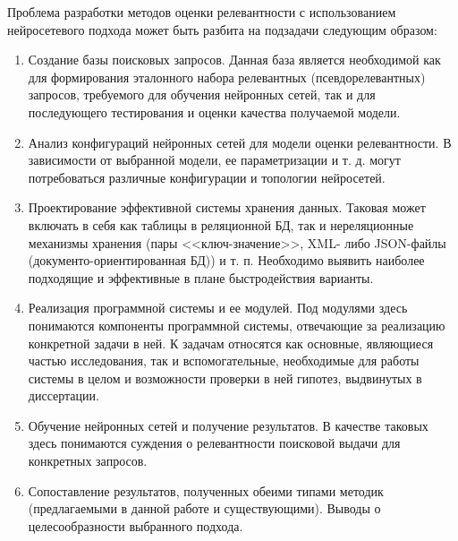 Проблема разработки методов оценки релевантности с использованием нейросетевого подхода может быть
разбита на подзадачи следующим образом:
\begin{enumerate}[1)]
    \item Создание базы поисковых запросов. Данная база является необходимой как для формирования эталонного
    набора релевантных (псевдорелевантных) запросов, требуемого для обучения нейронных сетей, так и для последующего
    тестирования и оценки качества получаемой модели.
    \item Анализ конфигураций нейронных сетей для модели оценки релевантности. В зависимости от выбранной модели,
    ее параметризации и т. д. могут потребоваться различные конфигурации и топологии нейросетей. 
    \item Проектирование эффективной системы хранения данных. Таковая может включать в себя как таблицы в реляционной
    БД, так и нереляционные механизмы хранения (пары <<ключ-значение>>, XML- либо JSON-файлы (документо-ориентированная БД))
    и т. п. Необходимо выявить наиболее подходящие и эффективные в плане быстродействия варианты.
    \item Реализация программной системы и ее модулей. Под модулями здесь понимаются компоненты программной системы,
    отвечающие за реализацию конкретной задачи в ней. К задачам относятся как основные, являющиеся частью исследования,
    так и вспомогательные, необходимые для работы системы в целом и возможности проверки в ней гипотез, выдвинутых в диссертации.
    \item Обучение нейронных сетей и получение результатов. В качестве таковых здесь понимаются суждения о релевантности
    поисковой выдачи для конкретных запросов.
    \item Сопоставление результатов, полученных обеими типами методик (предлагаемыми в данной работе и существующими). 
    Выводы о целесообразности выбранного подхода.
\end{enumerate}